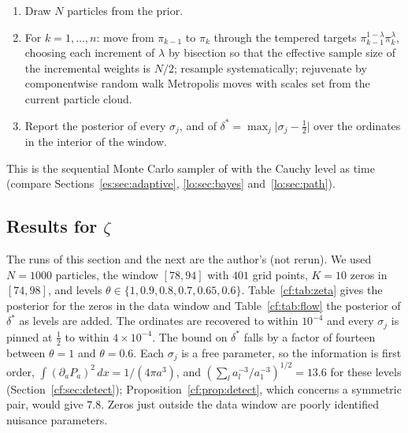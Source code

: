 \begin{enumerate}
\item Draw $N$ particles from the prior.
\item For $k=1,\dots,n$: move from $\pi_{k-1}$ to $\pi_k$ through the tempered targets $\pi_{k-1}^{1-\lambda}\pi_k^{\lambda}$, choosing each increment of $\lambda$ by bisection so that the effective sample size of the incremental weights is $N/2$; resample systematically; rejuvenate by componentwise random walk Metropolis moves with scales set from the current particle cloud.
\item Report the posterior of every $\sigma_j$, and of $\delta^\ast=\max_j\lvert\sigma_j-\frac12\rvert$ over the ordinates in the interior of the window.
\end{enumerate}
This is the sequential Monte Carlo sampler of \cite{Chopin02,DDJ06} with the Cauchy level as time (compare Sections~\ref{es:sec:adaptive}, \ref{lo:sec:bayes} and~\ref{lo:sec:path}).

\subsection{Results for $\zeta$}

The runs of this section and the next are the author's (not rerun). We used $N=1000$ particles, the window $[78,94]$ with $401$ grid points, $K=10$ zeros in $[74,98]$, and levels $\theta\in\{1,0.9,0.8,0.7,0.65,0.6\}$. Table~\ref{cf:tab:zeta} gives the posterior for the zeros in the data window and Table~\ref{cf:tab:flow} the posterior of $\delta^\ast$ as levels are added. The ordinates are recovered to within $10^{-4}$ and every $\sigma_j$ is pinned at $\frac12$ to within $4\times10^{-4}$. The bound on $\delta^\ast$ falls by a factor of fourteen between $\theta=1$ and $\theta=0.6$. Each $\sigma_j$ is a free parameter, so the information is first order, $\int(\partial_aP_a)^2\,dx=1/(4\pi a^3)$, and $(\sum_la_l^{-3}/a_1^{-3})^{1/2}=13.6$ for these levels (Section~\ref{cf:sec:detect}); Proposition~\ref{cf:prop:detect}, which concerns a symmetric pair, would give $7.8$. Zeros just outside the data window are poorly identified nuisance parameters.

